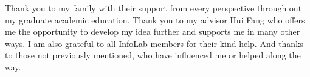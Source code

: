Thank you to my family with their support from every perspective through out my graduate academic education. 
Thank you to my advisor Hui Fang who offers me the opportunity to develop my idea further and supports me in many other ways. 
I am also grateful to all InfoLab members for their kind help. 
And thanks to those not previously mentioned, who have influenced me or helped along the way.
